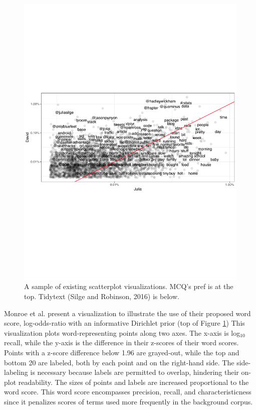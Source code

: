 \documentclass[11pt,a4paper]{article}
\begin{document}
\begin{figure}[h]
\includegraphics[width=\columnwidth]{tidytext}
\vspace{-0.8cm}
\caption{A sample of existing scatterplot visualizations. MCQ's pref is at the top. Tidytext (Silge and Robinson, 2016) is below.} 
\vspace{-0.5cm}
\label{scatters}
\end{figure}
Monroe et al.  present a visualization to illustrate the use of their proposed word score, log-odds-ratio with an informative Dirichlet prior (top of Figure \ref{scatters})  This visualization plots word-representing points along two axes.  The x-axis is log$_{10}$ recall, while the y-axis is the difference in their z-scores of their word scores.  Points with a z-score difference below 1.96 are grayed-out, while the top and bottom 20 are labeled, both by each point and on the right-hand side.  The side-labeling is necessary because labels are permitted to overlap, hindering their on-plot readability.  The sizes of points and labels are increased proportional to the word score. This word score encompasses precision, recall, and characteristicness since it penalizes scores of terms used more frequently in the background corpus. 
\end{document}

